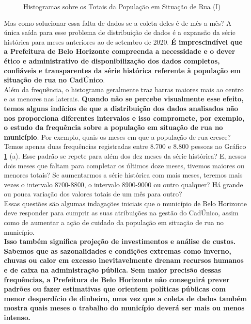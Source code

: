 \documentclass[12pt]{article}
\begin{document}
\begin{figure}[H]
	\caption{Histogramas sobre os Totais da População em Situação de Rua (I)}
	\qquad
	\label{fig:histogramas1_2}
\end{figure}

 Mas como solucionar essa falta de dados se a coleta deles é de mês a mês? A única saída para esse problema de distribuição de dados é a expansão da série histórica para meses anteriores ao de setembro de 2020. \textbf{É imprescindível que a Prefeitura de Belo Horizonte compreenda a necessidade e o dever ético e administrativo de disponibilização dos dados completos, confiáveis e transparentes da série histórica referente à população em situação de rua no CadÚnico}.\\

Além da frequência, o histograma geralmente traz barras maiores mais ao centro e as menores nas laterais. \textbf{Quando não se percebe visualmente esse efeito, temos alguns indícios de que a distribuição dos dados analisados não nos proporciona diferentes intervalos e isso compromete, por exemplo, o estudo da frequência sobre a população em situação de rua no município}. Por exemplo, quais os meses em que a população de rua cresce? Temos apenas duas frequências registradas entre 8.700 e 8.800 pessoas no Gráfico \ref{fig:histogramas1_2} (a). Esse padrão se repete para além dos dez meses da série histórica? E, nesses dois meses que faltam para completar os últimos doze meses, tivemos maiores ou menores totais? Se aumentarmos a série histórica com mais meses, teremos mais vezes o intervalo 8700-8800, o intervalo 8900-9000 ou outro qualquer? Há grande ou pouca variação dos valores totais de um mês para outro?\\

Essas questões são algumas indagações iniciais que o município de Belo Horizonte deve responder para cumprir as suas atribuições na gestão do CadÚnico, assim como de aumentar a ação de cuidado da população em situação de rua no município.\\

\textbf{Isso também significa projeção de investimentos e análise de custos. Sabemos que as sazonalidades e condições extremas como inverno, chuvas ou calor em excesso inevitavelmente drenam recursos humanos e de caixa na administração pública. Sem maior precisão dessas frequências, a Prefeitura de Belo Horizonte não conseguirá prever padrões ou fazer estimativas que orientem políticas públicas com menor desperdício de dinheiro, uma vez que a coleta de dados também mostra quais meses o trabalho do município deverá ser mais ou menos intenso.}\\
\end{document}
